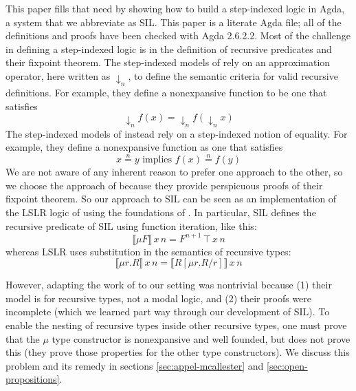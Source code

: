 \documentclass[acmsmall]{acmart}
\begin{document}
This paper fills that need by showing how to build a step-indexed
logic in Agda, a system that we abbreviate as SIL.  This paper is a
literate Agda file; all of the definitions and proofs have been
checked with Agda 2.6.2.2. 
%
Most of the challenge in defining a step-indexed logic is in the
definition of recursive predicates and their fixpoint theorem. The
step-indexed models of \citet{Appel:2001aa} rely on an approximation
operator, here written as $↓_n$, to define the semantic criteria for
valid recursive definitions.  For example, they define a nonexpansive
function to be one that satisfies
\[
  ↓_n f(x) = ↓_n f(↓_n x)
\]
The step-indexed models of \citet{JUNG:2018aa} instead rely on
a step-indexed notion of equality. For example, they define a
nonexpansive function as one that satisfies
\[
  x \stackrel{n}{=} y \text{ implies } f(x) \stackrel{n}{=} f(y)
\]
We are not aware of any inherent reason to prefer one approach to the
other, so we choose the approach of \citet{Appel:2001aa} because they
provide perspicuous proofs of their fixpoint theorem.  So our approach
to SIL can be seen as an implementation of the LSLR logic of
\citet{Dreyer:2011wl} using the foundations of
\citet{Appel:2001aa}. In particular, SIL defines the recursive
predicate of SIL using function iteration, like this:
\[
  ⟦ μ F ⟧ \, x \, n = F^{n\plus 1}\, \top \, x \, n
\]
whereas LSLR uses substitution in the semantics of recursive types:
\[
   ⟦ μ r. R ⟧ \, x \, n = ⟦ R[μr.R/r] ⟧\,x\,n
\]

However, adapting the work of \citet{Appel:2001aa} to our setting was
nontrivial because (1) their model is for recursive types, not a modal
logic, and (2) their proofs were incomplete (which we learned part way
through our development of SIL). To enable the nesting of recursive
types inside other recursive types, one must prove that the $μ$ type
constructor is nonexpansive and well founded, but \citet{Appel:2001aa}
does not prove this (they prove those properties for the other type
constructors).  We discuss this problem and its remedy in sections
\ref{sec:appel-mcallester} and \ref{sec:open-propositions}.
\end{document}
